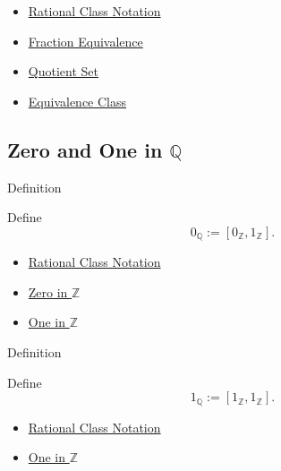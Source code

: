 \begin{dependencies}
\begin{itemize}
  \item \hyperref[def:rational-class-notation]{Rational Class Notation}
  \item \hyperref[def:fraction-equivalence]{Fraction Equivalence}
  \item \hyperref[def:quotient-set]{Quotient Set}
  \item \hyperref[def:equiv-class]{Equivalence Class}
\end{itemize}
\end{dependencies}

\subsection*{\texorpdfstring{Zero and One in $\mathbb{Q}$}{Zero and One in Q}}

\begin{definitionbox}{Definition}
\begin{definition}
\label{def:zero-in-q}
Define
\[
0_{\mathbb{Q}}:=[0_{\mathbb{Z}},1_{\mathbb{Z}}].
\]
\end{definition}
\end{definitionbox}

\begin{dependencies}
\begin{itemize}
  \item \hyperref[def:rational-class-notation]{Rational Class Notation}
  \item \hyperref[def:zero-in-z]{Zero in $\mathbb{Z}$}
  \item \hyperref[def:one-in-z]{One in $\mathbb{Z}$}
\end{itemize}
\end{dependencies}

\begin{definitionbox}{Definition}
\begin{definition}
\label{def:one-in-q}
Define
\[
1_{\mathbb{Q}}:=[1_{\mathbb{Z}},1_{\mathbb{Z}}].
\]
\end{definition}
\end{definitionbox}

\begin{dependencies}
\begin{itemize}
  \item \hyperref[def:rational-class-notation]{Rational Class Notation}
  \item \hyperref[def:one-in-z]{One in $\mathbb{Z}$}
\end{itemize}
\end{dependencies}

